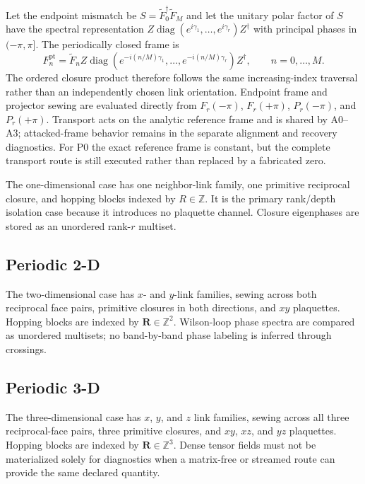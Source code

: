 \documentclass[11pt]{article}
\begin{document}
Let the endpoint mismatch be $S=\widetilde F_0^\dagger\widetilde F_M$ and let the unitary
polar factor of $S$ have the spectral representation
$Z\operatorname{diag}(e^{i\gamma_1},\ldots,e^{i\gamma_r})Z^\dagger$ with principal phases
in $(-\pi,\pi]$. The periodically closed frame is
\[
 F_n^{\mathrm{pt}}=\widetilde F_n
 Z\operatorname{diag}\!\left(e^{-i(n/M)\gamma_1},\ldots,
 e^{-i(n/M)\gamma_r}\right)Z^\dagger,
 \qquad n=0,\ldots,M.
\]
The ordered closure product therefore follows the same increasing-index traversal rather
than an independently chosen link orientation. Endpoint frame and projector sewing are
evaluated directly from $F_r(-\pi)$, $F_r(+\pi)$, $P_r(-\pi)$, and $P_r(+\pi)$.
Transport acts on the analytic reference frame and is shared by A0--A3; attacked-frame
behavior remains in the separate alignment and recovery diagnostics. For P0 the exact
reference frame is constant, but the complete transport route is still executed rather
than replaced by a fabricated zero.

The one-dimensional case has one neighbor-link family, one primitive reciprocal closure,
and hopping blocks indexed by $R\in\mathbb Z$. It is the primary rank/depth isolation
case because it introduces no plaquette channel. Closure eigenphases are stored as an
unordered rank-$r$ multiset.

\subsection{Periodic 2-D}

The two-dimensional case has $x$- and $y$-link families, sewing across both reciprocal
face pairs, primitive closures in both directions, and $xy$ plaquettes. Hopping blocks
are indexed by $\mathbf R\in\mathbb Z^2$. Wilson-loop phase spectra are compared as
unordered multisets; no band-by-band phase labeling is inferred through crossings.

\subsection{Periodic 3-D}

The three-dimensional case has $x$, $y$, and $z$ link families, sewing across all three
reciprocal-face pairs, three primitive closures, and $xy$, $xz$, and $yz$ plaquettes.
Hopping blocks are indexed by $\mathbf R\in\mathbb Z^3$. Dense tensor fields must not be
materialized solely for diagnostics when a matrix-free or streamed route can provide the
same declared quantity.
\end{document}
